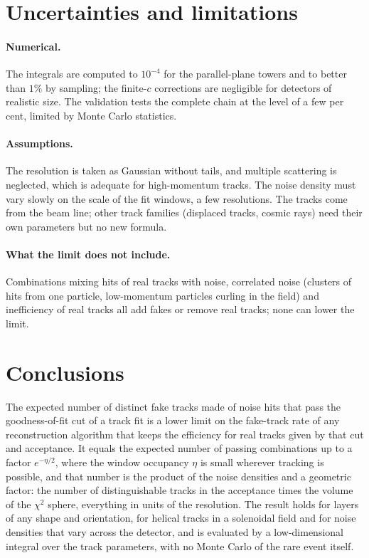 \IfFileExists{jinst.cls}{\documentclass[a4paper,11pt]{jinst}}
\begin{document}
\section{Uncertainties and limitations}\label{sec:limits}

\paragraph{Numerical.} The integrals are computed to $10^{-4}$ for the parallel-plane towers and
to better than $1\%$ by sampling; the finite-$c$ corrections are negligible for detectors of
realistic size. The validation tests the complete chain at the level of a few per cent, limited
by Monte Carlo statistics.

\paragraph{Assumptions.} The resolution is taken as Gaussian without tails, and multiple
scattering is neglected, which is adequate for high-momentum tracks. The noise density must vary
slowly on the scale of the fit windows, a few resolutions. The tracks come from the beam line;
other track families (displaced tracks, cosmic rays) need their own parameters but no new
formula.

\paragraph{What the limit does not include.} Combinations mixing hits of real tracks with noise,
correlated noise (clusters of hits from one particle, low-momentum particles curling in the field)
and inefficiency of real tracks all add fakes or remove real tracks; none can lower the limit.

\section{Conclusions}\label{sec:conclusions}

The expected number of distinct fake tracks made of noise hits that pass the goodness-of-fit cut of
a track fit is a lower limit on the fake-track rate of any reconstruction algorithm that keeps the
efficiency for real tracks given by that cut and acceptance. It equals the expected number of
passing combinations up to a factor $e^{-\eta/2}$, where the window occupancy $\eta$ is small
wherever tracking is possible, and that number is the product of the noise densities and a
geometric factor: the number of distinguishable tracks in the acceptance times the volume of the
$\chi^2$ sphere, everything in units of the resolution. The result holds for layers of any shape and
orientation, for helical tracks in a solenoidal field and for noise densities that vary across the
detector, and is evaluated by a low-dimensional integral over the track parameters, with no Monte
Carlo of the rare event itself.
\end{document}
